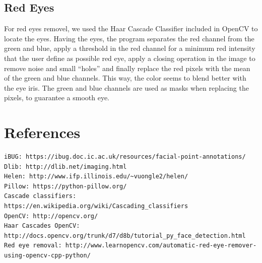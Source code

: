 \documentclass[12pt,a4paper]{article}
\begin{document}
\subsection{Red Eyes}
    For red eyes removel, we used the Haar Cascade Classifier included in OpenCV to locate the eyes. Having the eyes, the program separates the red channel from the green and blue, apply a threshold in the red channel for a minimum red intensity that the user define as possible red eye, apply a closing operation in the image to remove noise and small ``holes'' and finally replace the red pixels with the mean of the green and blue channels. This way, the color seems to blend better with the eye iris.
    The green and blue channels are used as masks when replacing the pixels, to guarantee a smooth eye.

\section{References}

\begin{verbatim}
iBUG: https://ibug.doc.ic.ac.uk/resources/facial-point-annotations/
Dlib: http://dlib.net/imaging.html
Helen: http://www.ifp.illinois.edu/~vuongle2/helen/ 
Pillow: https://python-pillow.org/ 
Cascade classifiers: https://en.wikipedia.org/wiki/Cascading_classifiers 
OpenCV: http://opencv.org/ 
Haar Cascades OpenCV: http://docs.opencv.org/trunk/d7/d8b/tutorial_py_face_detection.html 
Red eye removal: http://www.learnopencv.com/automatic-red-eye-remover-using-opencv-cpp-python/
\end{verbatim}
\end{document}
